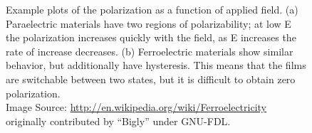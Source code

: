 \begin{figure}[tb]
   \centering
   \hspace{0.5cm}	
   \caption[Polarization vs. Applied Field Plots for FE and PE Materials]%
   		{Example plots of the polarization as a function of applied field. (a) Paraelectric materials %
		have two regions of polarizability; at low E the polarization increases quickly with the field, %
		as E increases the rate of increase decreases. (b) Ferroelectric materials show similar %
		behavior, but additionally have hysteresis. This means that the films are switchable %
		between two states, but it is difficult to obtain zero polarization.\\%
		{\tiny Image Source: \url{http://en.wikipedia.org/wiki/Ferroelectricity} originally contributed by ``Bigly'' %
		under GNU-FDL.}}
   \label{fig:PvElec}
\end{figure}































